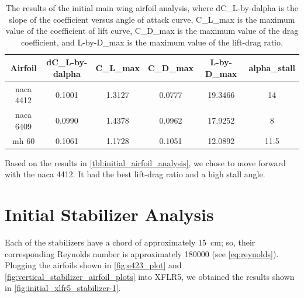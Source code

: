 \begin{table}[htpb]
    \centering
    \caption[Initial airfoil analysis]{The results of the initial main wing airfoil analysis, where \gls{dC_L-by-dalpha} is the slope of the coefficient versus angle of attack curve, \gls{C_L_max} is the maximum value of the coefficient of lift curve, \gls{C_D_max} is the maximum value of the drag coefficient, and \gls{L-by-D_max} is the maximum value of the lift-drag ratio.}
    \begin{tabular}{cccccc}
        \toprule
        \textbf{Airfoil} & \textbf{\gls{dC_L-by-dalpha}} & \textbf{\gls{C_L_max}} & \textbf{\gls{C_D_max}} & \textbf{\gls{L-by-D_max}} & \textbf{\gls{alpha_stall}} \\
        \midrule
        \acrshort{naca} 4412 & \num{0.1001} & \num{1.3127} & \num{0.0777} & \num{19.3466} & \num{14} \\
        \acrshort{naca} 6409 & \num{0.0990} & \num{1.4378} & \num{0.0962} & \num{17.9252} & \num{8} \\
        \acrshort{mh} 60 & \num{0.1061} & \num{1.1728} & \num{0.1051} & \num{12.0892} & \num{11.5} \\
        \bottomrule
    \end{tabular}
    \label{tbl:initial_airfoil_analysis}
\end{table}

Based on the results in \autoref{tbl:initial_airfoil_analysis}, we chose to move forward with the \acrshort{naca} 4412. It had the best lift-drag ratio and a high stall angle.

\section{Initial Stabilizer Analysis}

Each of the stabilizers have a chord of approximately \qty{15}{\centi\meter}; so, their corresponding Reynolds number is approximately \num{180000} (see \autoref{eq:reynolds}). Plugging the airfoils shown in \autoref{fig:e423_plot} and \autoref{fig:vertical_stabilizer_airfoil_plots} into XFLR5, we obtained the results shown in \autoref{fig:initial_xlfr5_stabilizer-1}.

